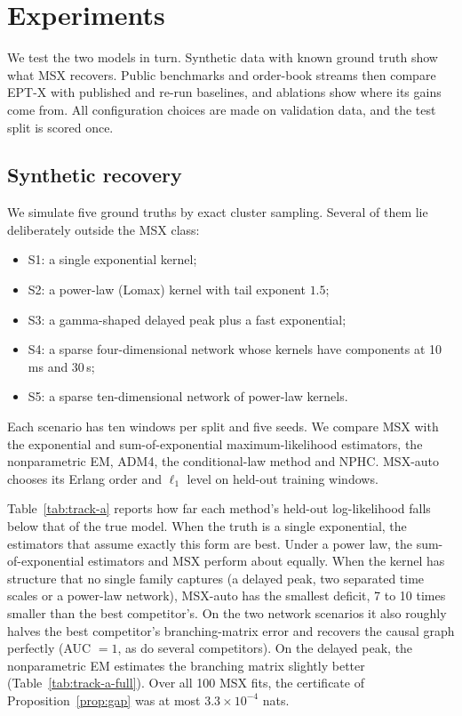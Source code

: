 \section{Experiments}\label{sec:experiments}

We test the two models in turn. Synthetic data with known ground truth show what MSX recovers.
Public benchmarks and order-book streams then compare EPT-X with published and re-run baselines,
and ablations show where its gains come from. All configuration choices are made on validation
data, and the test split is scored once.

\subsection{Synthetic recovery}\label{sec:synthetic}
We simulate five ground truths by exact cluster sampling. Several of them lie deliberately
outside the MSX class:
\begin{itemize}
\item S1: a single exponential kernel;
\item S2: a power-law (Lomax) kernel with tail exponent $1.5$;
\item S3: a gamma-shaped delayed peak plus a fast exponential;
\item S4: a sparse four-dimensional network whose kernels have components at 10\,ms and 30\,s;
\item S5: a sparse ten-dimensional network of power-law kernels.
\end{itemize}
Each scenario has ten windows per split and five seeds. We compare MSX with the exponential and
sum-of-exponential maximum-likelihood estimators, the nonparametric EM, ADM4, the conditional-law
method and NPHC. MSX-auto chooses its Erlang order and $\ell_1$ level on held-out training
windows.

Table~\ref{tab:track-a} reports how far each method's held-out log-likelihood falls below that of
the true model. When the truth is a single exponential, the estimators that assume exactly this
form are best. Under a power law, the sum-of-exponential estimators and MSX
perform about equally. When the kernel has structure that no single family captures (a delayed
peak, two separated time scales or a power-law network), MSX-auto has the smallest deficit, 7 to
10 times smaller than the best competitor's. On the two network scenarios it also roughly halves
the best competitor's branching-matrix error and recovers the causal graph perfectly (AUC $=1$,
as do several competitors). On the delayed peak, the nonparametric EM estimates the branching
matrix slightly better (Table~\ref{tab:track-a-full}). Over all 100 MSX fits, the certificate of
Proposition~\ref{prop:gap} was at most $3.3\times10^{-4}$ nats.

